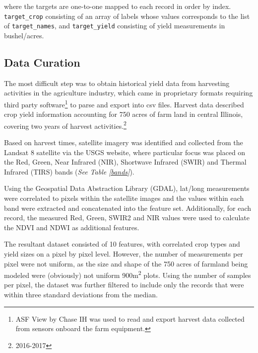 \documentclass[conference]{IEEEtran}
\begin{document}
\noindent
where the targets are one-to-one mapped to each record in order by index. \texttt{target\_crop} consisting of an array of labels whose values corresponds to the list of \texttt{target\_names}, and \texttt{target\_yield} consisting of yield measurements in bushel/acres.

\subsection{Data Curation}
The most difficult step was to obtain historical yield data from harvesting activities in the agriculture industry, which came in proprietary formats requiring third party software\footnote{ASF View by Chase IH was used to read and export harvest data collected from sensors onboard the farm equipment.} to parse and export into csv files. Harvest data described crop yield information accounting for 750 acres of farm land in central Illinois, covering two years of harvest activities.\footnote{2016-2017}

Based on harvest times, satellite imagery was identified and collected from the Landsat 8 satellite via the USGS website, where particular focus was placed on the Red, Green, Near Infrared (NIR), Shortwave Infrared (SWIR) and Thermal Infrared (TIRS) bands (\textit{See Table \ref{bands}}).

Using the Geospatial Data Abstraction Library (GDAL), lat/long measurements were correlated to pixels within the satellite images and the values within each band were extracted and concatenated into the feature set.  Additionally, for each record, the measured Red, Green, SWIR2 and NIR values were used to calculate the NDVI\cite{1974} and NDWI\cite{1}\cite{01431169608948714} as additional features.

The resultant dataset consisted of 10 features, with correlated crop types and yield sizes on a pixel by pixel level.  However, the number of measurements per pixel were not uniform, as the size and shape of the 750 acres of farmland being modeled were (obviously) not uniform 900m\textsuperscript{2} plots.  Using the number of samples per pixel, the dataset was further filtered to include only the records that were within three standard deviations from the median.
\end{document}
